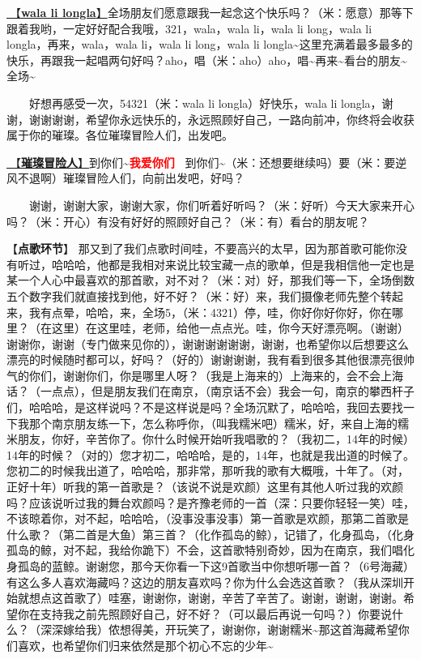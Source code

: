 \documentclass[]{ctexbook}
\begin{document}
\hyperref[wala-li-longla]{🎵【\textbf{wala li longla}】}全场朋友们愿意跟我一起念这个快乐吗？（米：愿意）那等下跟着我哟，一定好好配合我哦，321，wala，wala li，wala li long，wala li longla，再来，wala，wala li，wala li long，wala li longla\textasciitilde 这里充满着最多最多的快乐，再跟我一起唱两句好吗？aho，唱（米：aho）aho，唱\textasciitilde 再来\textasciitilde 看台的朋友\textasciitilde 全场\textasciitilde{}

  好想再感受一次，54321（米：wala li longla）好快乐，wala li longla，谢谢，谢谢谢谢，希望你永远快乐的，永远照顾好自己，一路向前冲，你终将会收获属于你的璀璨。各位璀璨冒险人们，出发吧。

\hyperref[adventurers]{🎵【\textbf{璀璨冒险人}】}到你们\textasciitilde{}\textbf{\textcolor{red}{我爱你们~} } 到你们\textasciitilde（米：还想要继续吗）要（米：要逆风不退啊）璀璨冒险人们，向前出发吧，好吗？

  谢谢，谢谢大家，谢谢大家，你们听着好听吗？（米：好听）今天大家来开心吗？（米：开心）有没有好好的照顾好自己？（米：有）看台的朋友呢？

【\textbf{点歌环节}】
那又到了我们点歌时间哇，不要高兴的太早，因为那首歌可能你没有听过，哈哈哈，他都是我相对来说比较宝藏一点的歌单，但是我相信他一定也是某一个人心中最喜欢的那首歌，对不对？（米：对）好，那我们等一下，全场倒数五个数字我们就直接找到他，好不好？（米：好）来，我们摄像老师先整个转起来，我有点晕，哈哈，来，全场5，（米：4321）停，哇，你好你好你好，你在哪里？（在这里）在这里哇，老师，给他一点点光。哇，你今天好漂亮啊。（谢谢）谢谢你，谢谢（专门做来见你的），谢谢谢谢谢谢，谢谢，也希望你以后想要这么漂亮的时候随时都可以，好吗？（好的）谢谢谢谢，我有看到很多其他很漂亮很帅气的你们，谢谢你们，你是哪里人呀？（我是上海来的）上海来的，会不会上海话？（一点点），但是朋友我们在南京，（南京话不会）我会一句，南京的攀西杆子们，哈哈哈，是这样说吗？不是这样说是吗？全场沉默了，哈哈哈，我回去要找一下我那个南京朋友练一下，怎么称呼你，（叫我糯米吧）糯米，好，来自上海的糯米朋友，你好，辛苦你了。你什么时候开始听我唱歌的？（我初二，14年的时候）14年的时候？（对的）您才初二，哈哈哈，是的，14年，也就是我出道的时候了。您初二的时候我出道了，哈哈哈，那非常，那听我的歌有大概哦，十年了。（对，正好十年）听我的第一首歌是？（该说不说是欢颜）这里有其他人听过我的欢颜吗？应该说听过我的舞台欢颜吗？是齐豫老师的一首（深：只要你轻轻一笑）哇，不该晾着你，对不起，哈哈哈，（没事没事没事）第一首歌是欢颜，那第二首歌是什么歌？（第二首是大鱼）第三首？（化作孤岛的鲸），记错了，化身孤岛，（化身孤岛的鲸，对不起，我给你跪下）不会，这首歌特别奇妙，因为在南京，我们唱化身孤岛的蓝鲸。谢谢您，那今天你看一下这9首歌当中你想听哪一首？（6号海藏）有这么多人喜欢海藏吗？这边的朋友喜欢吗？你为什么会选这首歌？（我从深圳开始就想点这首歌了）哇塞，谢谢你，谢谢，辛苦了辛苦了。谢谢，谢谢，谢谢。希望你在支持我之前先照顾好自己，好不好？（可以最后再说一句吗？）你要说什么？（深深嫁给我）侬想得美，开玩笑了，谢谢你，谢谢糯米\textasciitilde 那这首海藏希望你们喜欢，也希望你们归来依然是那个初心不忘的少年\textasciitilde{}
\end{document}

